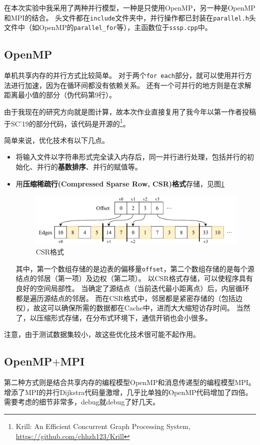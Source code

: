 \documentclass[reportComp]{thesis}
\begin{document}
在本次实验中我采用了两种并行模型，一种是只使用OpenMP，另一种是OpenMP和MPI的结合。
头文件都在\verb'include'文件夹中，并行操作都已封装在\verb'parallel.h'头文件中（如OpenMP的\verb'parallel_for'等），主函数位于\verb'sssp.cpp'中。

\subsection{OpenMP}
\label{sub:openmp}
单机共享内存的并行方式比较简单。
对于两个\verb'for each'部分，就可以使用并行方法进行加速，因为在循环间都没有依赖关系。
还有一个可并行的地方则是在求解距离最小值的部分（伪代码第9行）。

由于我现在的研究方向就是图计算，故本次作业直接复用了我今年以第一作者投稿于SC'19的部分代码，该代码是开源的\footnote{Krill: An Efficient Concurrent Graph Processing System, \url{https://github.com/chhzh123/Krill}}。

简单来说，优化技术有以下几点。
\begin{itemize}
	\item 将输入文件以字符串形式完全读入内存后，同一并行进行处理，包括并行的初始化、并行的\textbf{基数排序}、并行的赋值等。
	\item 用\textbf{压缩稀疏行(Compressed Sparse Row, CSR)格式}存储，见图\ref{fig:csr}
	\begin{figure}[H]
	\centering
	\includegraphics[width=0.8\linewidth]{fig/CSR.pdf}
	\caption{CSR格式}
	\label{fig:csr}
	\end{figure}
	其中，第一个数组存储的是边表的偏移量\verb'offset'，第二个数组存储的是每个源结点的邻居（第一项）及边权（第二项）。
	以CSR格式存储，可以使程序具有良好的空间局部性。
	当确定了源结点（当前迭代最小距离点）后，内层循环都是遍历源结点的邻居。
	而在CSR格式中，邻居都是紧密存储的（包括边权），故这可以确保所需的数据都在Cache中，进而大大缩短访存时间。
	当然了，以压缩形式存储，在分布式环境下，通信开销也会小很多。
\end{itemize}

注意，由于测试数据集较小，故这些优化技术很可能不起作用。

\subsection{OpenMP$+$MPI}
第二种方式则是结合共享内存的编程模型OpenMP和消息传递型的编程模型MPI。
增添了MPI的并行Dijkstra代码量激增，几乎比单独的OpenMP代码增加了四倍。
需要考虑的细节非常多，debug就debug了好几天。
\end{document}

